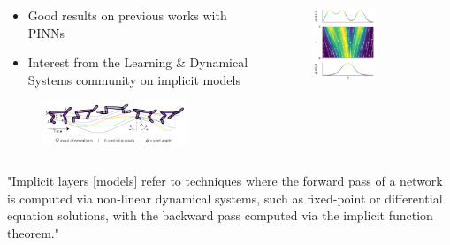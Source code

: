 \documentclass[t]{beamer}
\begin{document}
\begin{frame}
    \begin{columns}
        \begin{column}{0.5\textwidth}
	    \begin{itemize}[label={\textbullet}]
	        \item Good results on previous works with PINNs
		\item Interest from the Learning \& Dynamical Systems community on implicit models
	    \end{itemize}
	    \begin{figure}[h]
	        \centering
	        \includegraphics[width=0.8\textwidth]{ltc.png}
		\cite{Ramin_ltc_2020}
	    \end{figure}
        \end{column}
	\begin{column}{0.5\textwidth}
	    \begin{figure}[h]
	        \centering
	        \includegraphics[width=0.6\textwidth]{normalizing-flows.png}
		\cite{Gratwohl_ffjord_2018}
	    \end{figure}
	\end{column}
    \end{columns}
    \quad

    \quad

	    "Implicit layers [models] refer to techniques where the forward pass of a network is computed via non-linear dynamical systems, such as fixed-point or differential equation solutions, with the backward pass computed via the implicit function theorem." \cite{NEURIPS2021_4ffbd5c8}
\end{frame}
\end{document}
